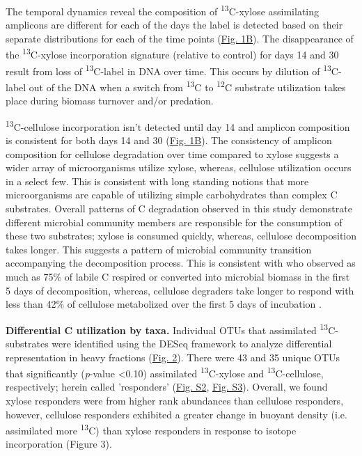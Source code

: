The temporal dynamics reveal the composition of \textsuperscript{13}C-xylose assimilating amplicons are different for each of the days the label is detected based on their separate distributions for each of the time points (\href{https://www.authorea.com/users/3537/articles/3612/master/file/figures/ordination_all1/ordination_all1.png}{Fig. 1B}). The disappearance of the \textsuperscript{13}C-xylose incorporation signature (relative to control) for days 14 and 30 result from loss of \textsuperscript{13}C-label in DNA over time. This occurs by dilution of \textsuperscript{13}C-label out of the DNA when a switch from \textsuperscript{13}C to \textsuperscript{12}C substrate utilization takes place during biomass turnover and/or predation. 

\textsuperscript{13}C-cellulose incorporation isn't detected until day 14 and amplicon composition is consistent for both days 14 and 30 (\href{https://www.authorea.com/users/3537/articles/3612/master/file/figures/ordination_all1/ordination_all1.png}{Fig. 1B}). The consistency of amplicon composition for cellulose degradation over time compared to xylose suggests a wider array of microorganisms utilize xylose, whereas, cellulose utilization occurs in a select few. This is consistent with long standing notions that more microorganisms are capable of utilizing simple carbohydrates than complex C substrates. Overall patterns of C degradation observed in this study demonstrate different microbial community members are responsible for the consumption of these two substrates; xylose is consumed quickly, whereas, cellulose decomposition takes longer. This suggests a pattern of microbial community transition accompanying the decomposition process. This is consistent with \cite{Engelking_2007} who observed as much as 75\% of labile C respired or converted into microbial biomass in the first 5 days of decomposition, whereas, cellulose degraders take longer to respond \cite{Hu_1997} with less than 42\% of cellulose metabolized over the first 5 days of incubation \cite{Engelking_2007}. 

\textbf{Differential C utilization by taxa.} Individual OTUs that assimilated \textsuperscript{13}C-substrates were identified using the DESeq framework \cite{Anders_Huber_2010} to analyze differential representation in heavy fractions (\href{https://www.authorea.com/users/3537/articles/3612/master/file/figures/l2fc_fig1/l2fc_fig.pdf}{Fig. 2}). There were 43 and 35 unique OTUs that significantly (\textit{p}-value \textless 0.10) assimilated \textsuperscript{13}C-xylose and \textsuperscript{13}C-cellulose, respectively; herein called 'responders' (\href{https://www.authorea.com/users/3537/articles/8459/master/file/figures/OTU_screening_schematic/OTU_screening_schematic.pdf}{Fig. S2}, \href{https://www.authorea.com/users/3537/articles/8459/master/file/figures/l2fc_fig_pVal/l2fc_fig_pVal.png}{Fig. S3}). Overall, we found xylose responders were from higher rank abundances than cellulose responders, however, cellulose responders exhibited a greater change in buoyant density (i.e. assimilated more \textsuperscript{13}C) than xylose responders in response to isotope incorporation (Figure 3). 

